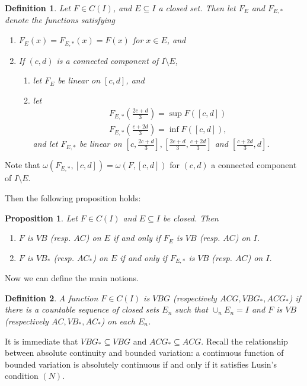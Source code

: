 \documentclass[12pt]{amsart}
\newtheorem{prop}[theorem]{Proposition}
\newtheorem{definition}{Definition}
\begin{document}
\begin{definition}
Let $F\in C(I)$, and $E\subseteq I$ a closed set.  Then let $F_{E}$ 
and $F_{E,\ast}$ denote the functions satisfying
\begin{enumerate}
\item $F_{E}(x) = F_{E,\ast}(x) = F(x)$ for $x\in E$, and 
\item If $(c,d)$ is a connected component of $I\setminus E$, 
\begin{enumerate}
\item let $F_E$ be linear on $[c,d]$, and 
\item let 
\begin{align*}F_{E,\ast}\left(\frac{2c+d}{3}\right) = \sup F([c,d]) \\
F_{E,\ast}\left(\frac{c+2d}{3}\right) = \inf F([c,d]),\end{align*} 
and let $F_{E,\ast}$ be linear 
on $[c, \frac{2c+d}{3}], [\frac{2c+d}{3}, \frac{c + 2d}{3}]$ and 
$[\frac{c+2d}{3},d]$.
\end{enumerate}
\end{enumerate}
\end{definition}
Note that $\omega(F_{E,\ast}, [c,d]) = \omega(F,[c,d])$ 
for $(c,d)$ a connected component of $I\setminus E$.

Then the following proposition holds:
\begin{prop}\label{prop:linearized}
 Let $F \in C(I)$ and $E\subseteq I$ be closed.  Then
\begin{enumerate}
\item $F$ is $VB$ (resp. $AC$) on $E$ if and only if $F_E$ is $VB$ 
(resp. $AC$) on $I$.
\item $F$ is $VB_\ast$ (resp. $AC_\ast$) on $E$ if and only if 
$F_{E,\ast}$ is $VB$ (resp. $AC$) on $I$.
\end{enumerate}
\end{prop}




Now we can define the main notions.

\begin{definition}
A function $F\in C(I)$ is $VBG$ (respectively $ACG, VBG_\ast, ACG_\ast$) 
if there is a 
countable sequence of closed sets $E_n$ such that $\cup_n E_n = I$ 
and $F$ is $VB$ (respectively $AC, VB_\ast, AC_\ast$) on each $E_n$.
\end{definition}

It is immediate that $VBG_\ast \subseteq VBG$ and $ACG_\ast \subseteq ACG$.
Recall the relationship between absolute continuity and bounded variation:
a continuous function of bounded variation is absolutely continuous if and
only if it satisfies Lusin's condition $(N)$.
\end{document}
